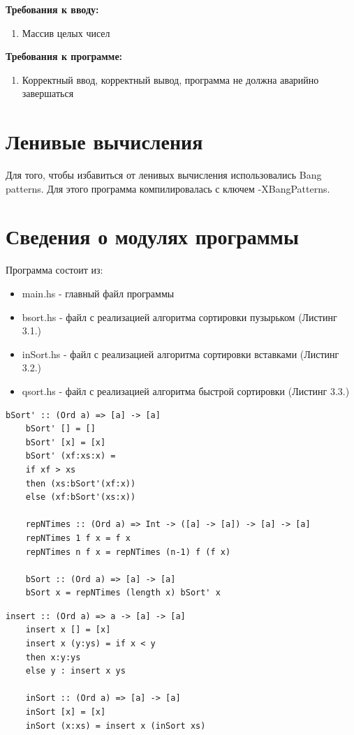 \documentclass[12pt]{report}
\begin{document}
\textbf{Требования к вводу:}
\begin{enumerate}
	\item Массив целых чисел
\end{enumerate}

\textbf{Требования к программе:}
\begin{enumerate}
	\item Корректный ввод, корректный вывод, программа не должна аварийно завершаться
\end{enumerate}

\section{Ленивые вычисления}

Для того, чтобы избавиться от ленивых вычисления использовались Bang patterns.
Для этого программа компилировалась с ключем -XBangPatterns.

\section{Сведения о модулях программы}
Программа состоит из:
\begin{itemize}
	\item main.hs - главный файл программы
	\item bsort.hs - файл с реализацией алгоритма сортировки пузырьком (Листинг 3.1.)
	\item inSort.hs - файл с реализацией алгоритма сортировки вставками (Листинг 3.2.)
	\item qsort.hs - файл с реализацией алгоритма быстрой сортировки (Листинг 3.3.)
\end{itemize}

\begin{lstlisting}[label=some-code,caption=Сортировка пузырьком]
	bSort' :: (Ord a) => [a] -> [a]
	bSort' [] = []
	bSort' [x] = [x]
	bSort' (xf:xs:x) = 
	if xf > xs
	then (xs:bSort'(xf:x))
	else (xf:bSort'(xs:x))
	
	repNTimes :: (Ord a) => Int -> ([a] -> [a]) -> [a] -> [a]
	repNTimes 1 f x = f x
	repNTimes n f x = repNTimes (n-1) f (f x)
	
	bSort :: (Ord a) => [a] -> [a]
	bSort x = repNTimes (length x) bSort' x 
\end{lstlisting}

\begin{lstlisting}[label=some-code,caption=Сортировка вставками]
	insert :: (Ord a) => a -> [a] -> [a]
	insert x [] = [x]
	insert x (y:ys) = if x < y 
	then x:y:ys 
	else y : insert x ys
	
	inSort :: (Ord a) => [a] -> [a]
	inSort [x] = [x]
	inSort (x:xs) = insert x (inSort xs)       
\end{lstlisting}
\end{document}
